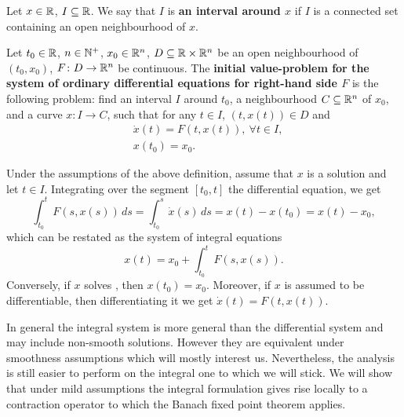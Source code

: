 \begin{definition}
  Let $x \in \mathbb{R}$, $I \subseteq \mathbb{R}$.
  We say that $I$ is \textbf{an interval around $x$} if $I$ is a connected set
  containing an open neighbourhood of $x$.
\end{definition}
\begin{definition}
  Let
    $t_0 \in \mathbb{R}$,
    $n \in \mathbb{N}^+$,
    $x_0 \in \mathbb{R}^n$,
    $D \subseteq \mathbb{R} \times \mathbb{R}^n$ be an open neighbourhood of $(t_0, x_0)$,
    $F \colon D \to \mathbb{R}^n$ be continuous.
  The \textbf{initial value-problem for the system of ordinary differential
  equations for right-hand side $F$} is the following problem: find
    an interval $I$ around $t_0$,
    a neighbourhood $C \subseteq \mathbb{R}^n$ of $x_0$,
    and a curve $x \colon I \to C$,
  such that for any $t \in I$, $(t, x(t)) \in D$ and
  \begin{subequations}
    \label{equation:ordinary_differential_equation/initial_value_problem}
    \begin{alignat}{1}
      & \dot{x}(t) = F(t, x(t)),\ \forall t \in I, \\
      & x(t_0) = x_0.
    \end{alignat}
  \end{subequations}
\end{definition}
\begin{discussion}
  Under the assumptions of the above definition, assume that $x$ is a solution
  and let $t \in I$.
  Integrating over the segment $[t_0, t]$ the differential equation, we get
  \begin{equation}
    \int_{t_0}^t F(s, x(s))\, d s
    = \int_{t_0}^s \dot{x}(s)\, d s
    = x(t) - x(t_0)
    = x(t) - x_0,
  \end{equation}
  which can be restated as the system of integral equations
  \begin{equation}
    \label{equation:ordinary_differential_equation/initial_value_problem/integral}
    x(t) = x_0 + \int_{t_0}^t F(s, x(s)).
  \end{equation}
  Conversely, if $x$ solves
  ,
  then $x(t_0) = x_0$.
  Moreover, if $x$ is assumed to be differentiable, then differentiating it we
  get $\dot{x}(t) = F(t, x(t))$.

  In general the integral system
  is more general than the differential system
  and may include non-smooth solutions.
  However they are equivalent under smoothness assumptions which will mostly
  interest us.
  Nevertheless, the analysis is still easier to perform on the integral one to
  which we will stick.
  We will show that under mild assumptions the integral formulation gives rise
  locally to a contraction operator to which the Banach fixed point theorem
  applies.
\end{discussion}
